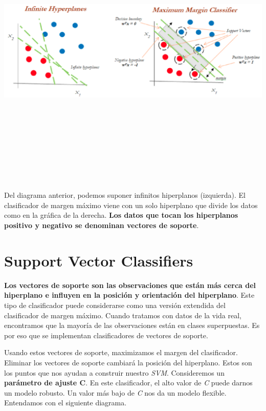 \documentclass[
]{book}
\begin{document}
\begin{center}\includegraphics[width=900pt,height=380pt]{img/02-svm/02_maximum_margin_classifier} \end{center}

Del diagrama anterior, podemos suponer infinitos hiperplanos (izquierda). El clasificador de margen máximo viene con un solo hiperplano que divide los datos como en la gráfica de la derecha. \textbf{Los datos que tocan los hiperplanos positivo y negativo se denominan vectores de soporte}.

\hypertarget{support-vector-classifiers}{%
\section{Support Vector Classifiers}\label{support-vector-classifiers}}

\textbf{Los vectores de soporte son las observaciones que están más cerca del hiperplano e influyen en la posición y orientación del hiperplano}. Este tipo de clasificador puede considerarse como una versión extendida del clasificador de margen máximo. Cuando tratamos con datos de la vida real, encontramos que la mayoría de las observaciones están en clases superpuestas. Es por eso que se implementan clasificadores de vectores de soporte.

Usando estos vectores de soporte, maximizamos el margen del clasificador. Eliminar los vectores de soporte cambiará la posición del hiperplano. Estos son los puntos que nos ayudan a construir nuestro \emph{SVM}. Consideremos un \textbf{parámetro de ajuste C}. En este clasificador, el alto valor de \emph{C} puede darnos un modelo robusto. Un valor más bajo de \emph{C} nos da un modelo flexible. Entendamos con el siguiente diagrama.
\end{document}
